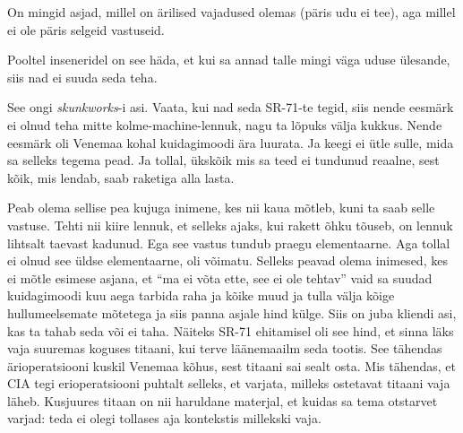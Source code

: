 
On mingid asjad, millel on ärilised vajadused olemas (päris udu ei tee),  aga millel ei ole päris selgeid vastuseid. 

Pooltel inseneridel on see häda, et kui sa annad talle mingi väga uduse ülesande, siis nad ei suuda seda teha.


See ongi \emph{skunkworks}-i asi. Vaata, kui nad seda SR-71-te tegid, siis nende eesmärk ei olnud teha mitte kolme-machine-lennuk, nagu ta lõpuks välja kukkus. Nende eesmärk oli Venemaa kohal kuidagimoodi ära luurata. Ja keegi ei ütle sulle, mida sa selleks tegema pead. Ja tollal, ükskõik mis sa teed ei tundunud reaalne, sest  kõik, mis lendab, saab raketiga alla lasta. 

Peab olema sellise pea kujuga inimene, kes nii kaua mõtleb, kuni ta saab selle vastuse. Tehti nii kiire lennuk, et  selleks ajaks, kui rakett õhku tõuseb, on lennuk lihtsalt taevast kadunud. Ega see vastus tundub praegu elementaarne. Aga tollal  ei olnud see üldse elementaarne,  oli võimatu. Selleks peavad olema  inimesed, kes ei mõtle esimese asjana, et \enquote{ma ei võta ette, see ei ole tehtav} vaid sa suudad kuidagimoodi kuu aega tarbida raha ja kõike muud ja tulla välja kõige hullumeelsemate mõtetega ja siis panna asjale hind külge. Siis on juba kliendi asi, kas ta tahab seda või ei taha. Näiteks SR-71 ehitamisel oli see hind, et sinna läks vaja suuremas koguses titaani, kui terve läänemaailm seda tootis. See tähendas ärioperatsiooni kuskil Venemaa kõhus, sest titaani sai sealt osta. Mis tähendas, et CIA tegi erioperatsiooni puhtalt selleks, et varjata, milleks ostetavat titaani vaja läheb. Kusjuures titaan on nii haruldane materjal, et kuidas sa tema otstarvet varjad: teda ei olegi tollases aja kontekstis millekski vaja. 


